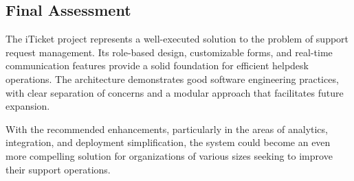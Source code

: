 \documentclass[12pt,a4paper]{article}
\begin{document}
\subsection{Final Assessment}

The iTicket project represents a well-executed solution to the problem of support request management. Its role-based design, customizable forms, and real-time communication features provide a solid foundation for efficient helpdesk operations. The architecture demonstrates good software engineering practices, with clear separation of concerns and a modular approach that facilitates future expansion.

With the recommended enhancements, particularly in the areas of analytics, integration, and deployment simplification, the system could become an even more compelling solution for organizations of various sizes seeking to improve their support operations.
\end{document}
